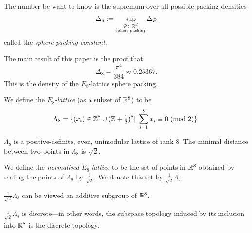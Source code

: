 \begin{definition}\label{SpherePacking.Constant}\leanok
The number be want to know is the supremum over all possible packing densities
$$\Delta_d:=\sup\limits_{\substack{\mathcal{P}\subset\mathbb{R}^d\\ \scriptscriptstyle\mathrm{sphere}\;\mathrm{packing}}}\Delta_{\mathcal{P}} $$
called the \emph{sphere packing constant}.
\end{definition}

The main result of this paper is the proof that $$\Delta_8=\frac{\pi^4}{384}\approx 0.25367.$$
This is the density of the $E_8$-lattice sphere packing.

\begin{definition}\label{E8_Set}\leanok
  We define the \emph{$E_8$-lattice} (as a subset of $\mathbb{R}^8$) to be
$$\Lambda_8=\{(x_i)\in\mathbb{Z}^8\cup(\mathbb{Z}+\textstyle\frac12\displaystyle )^8|\;\sum_{i=1}^8x_i\equiv 0\;(\mathrm{mod\;2})\}.$$
\end{definition}

\begin{lemma}\label{lemma: Characterisation of E8 lattice}
  $\Lambda_8$ is a positive-definite, even, unimodular lattice of rank 8. The minimal distance between two points in $\Lambda_8$ is $\sqrt{2}$.
\end{lemma}

\begin{definition}\label{E8_Normalised_Set}\leanok
  We define the \emph{normalised $E_8$-lattice} to be the set of points in $\mathbb{R}^8$ obtained by scaling the points of $\Lambda_8$ by $\frac{1}{\sqrt{2}}$. We denote this set by $\frac{1}{\sqrt{2}}\Lambda_8$.
\end{definition}

\begin{lemma}\label{E8_Normalised_Lattice}\leanok
  $\frac{1}{\sqrt{2}}\Lambda_8$ can be viewed an additive subgroup of $\mathbb{R}^8$.
\end{lemma}

\begin{lemma}\label{instDiscreteE8NormalisedSet}\leanok
  $\frac{1}{\sqrt{2}}\Lambda_8$ is discrete---in other words, the subspace topology induced by its inclusion into $\mathbb{R}^8$ is the discrete topology.
\end{lemma}

